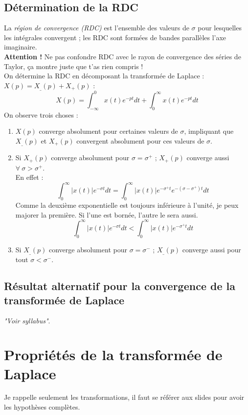 	\subsection{Détermination de la RDC}
	La \textit{région de convergence (RDC)} est l'ensemble des valeurs de $\sigma$ 
	pour lesquelles les intégrales convergent ; les RDC sont formées de bandes 
	parallèles  l'axe imaginaire.\\
	\textbf{Attention !} Ne pas confondre RDC avec le rayon de convergence des 
	séries de Taylor, ça montre juste que t'as rien compris !\\
	On détermine la RDC en décomposant la transformée de Laplace : $X(p) = X_\_(p)+
	X_+(p)$ :
	\begin{equation}
	X(p) = \int_{-\infty}^0 x(t)e^{-pt}dt + \int_0^\infty x(t)e^{-pt}dt
	\end{equation}
	On observe trois choses :
	\begin{enumerate}
	\item $X(p)$ converge absolument pour certaines valeurs de $\sigma$, impliquant 
	que $X_\_(p)$ et  $X_+(p)$ convergent absolument pour ces valeurs de $\sigma$.
	\item Si $X_+(p)$ converge absolument pour $\sigma=\sigma^+$ ; $X_+(p)$ converge aussi
	$\forall\ \sigma>\sigma^+$.\\
	En effet : 
	\begin{equation}
	\int_0^\infty |x(t)|e^{-\sigma t}dt = \int_0^\infty |x(t)|e^{-\sigma^+t}e^{-
	(\sigma-\sigma^+)t} dt
	\end{equation}
	Comme la deuxième exponentielle est toujours inférieure à l'unité, je peux 
	majorer la première. Si l'une est bornée, l'autre le sera aussi.
	\begin{equation}
	\int_0^\infty |x(t)|e^{-\sigma t}dt < \int_0^\infty |x(t)|e^{-\sigma^+t}dt
	\end{equation}
	\item Si $X_\_(p)$ converge absolument pour $\sigma = \sigma^-$ ; $X_\_(p)$ converge aussi  
	pour tout $\sigma < \sigma^-$.
	\end{enumerate}


	\subsection{Résultat alternatif pour la convergence de la transformée de Laplace}
	\textit{"Voir syllabus"}.


\section{Propriétés de la transformée de Laplace}
Je rappelle seulement les transformations, il faut se référer aux slides pour avoir
les hypothèses complètes.
